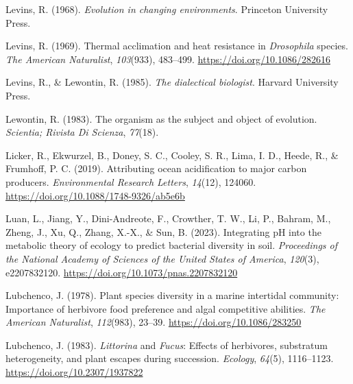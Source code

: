 \documentclass{CSUNthesis}
\begin{document}
\vspace{0.1em}

Levins, R. (1968). \textit{Evolution in changing environments}. Princeton University Press.

\vspace{0.1em}

Levins, R. (1969). Thermal acclimation and heat resistance in \textit{Drosophila} species. \textit{The American Naturalist}, \textit{103}(933), 483--499. \url{https://doi.org/10.1086/282616}

\vspace{0.1em}

Levins, R., \& Lewontin, R. (1985). \textit{The dialectical biologist}. Harvard University Press.

\vspace{0.1em}

Lewontin, R. (1983). The organism as the subject and object of evolution. \textit{Scientia; Rivista Di Scienza}, \textit{77}(18).

\vspace{0.1em}

Licker, R., Ekwurzel, B., Doney, S. C., Cooley, S. R., Lima, I. D., Heede, R., \& Frumhoff, P. C. (2019). Attributing ocean acidification to major carbon producers. \textit{Environmental Research Letters}, \textit{14}(12), 124060. \url{https://doi.org/10.1088/1748-9326/ab5e6b}

\vspace{0.1em}

Luan, L., Jiang, Y., Dini-Andreote, F., Crowther, T. W., Li, P., Bahram, M., Zheng, J., Xu, Q., Zhang, X.-X., \& Sun, B. (2023). Integrating pH into the metabolic theory of ecology to predict bacterial diversity in soil. \textit{Proceedings of the National Academy of Sciences of the United States of America}, \textit{120}(3), e2207832120. \url{https://doi.org/10.1073/pnas.2207832120}

\vspace{0.1em}

Lubchenco, J. (1978). Plant species diversity in a marine intertidal community: Importance of herbivore food preference and algal competitive abilities. \textit{The American Naturalist}, \textit{112}(983), 23--39. \url{https://doi.org/10.1086/283250}

\vspace{0.1em}

Lubchenco, J. (1983). \textit{Littorina} and \textit{Fucus}: Effects of herbivores, substratum heterogeneity, and plant escapes during succession. \textit{Ecology}, \textit{64}(5), 1116--1123. \url{https://doi.org/10.2307/1937822}
\end{document}
